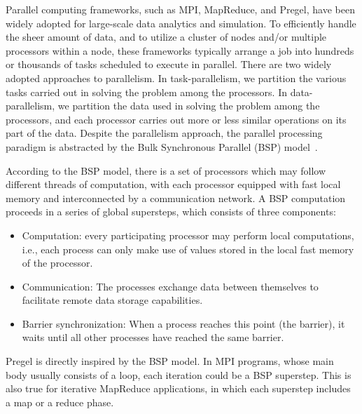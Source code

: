 Parallel computing frameworks, such as MPI, MapReduce, and Pregel, have been widely adopted for large-scale data analytics and simulation. To efficiently handle the sheer amount of data, and to utilize a cluster of nodes and/or multiple processors within a node, these frameworks typically arrange a job into hundreds or thousands of tasks scheduled to execute in parallel.
There are two widely adopted approaches to parallelism.
In task-parallelism, we partition the various tasks carried out in solving the problem among the processors. In data-parallelism, we partition the data used in solving the problem among the processors, and each processor carries out more or less similar operations on its part of the data. Despite the parallelism approach, the parallel processing paradigm is abstracted by the Bulk Synchronous Parallel (BSP) model~\cite{skillicorn1997questions}. 



According to the BSP model, there is a set of processors which may follow different threads of computation, with each processor equipped with fast local memory and interconnected by a communication network. A BSP computation proceeds in a series of global supersteps, which consists of three components:
\begin{itemize}
	\item Computation: every participating processor may perform local computations, i.e., each process can only make use of values stored in the local fast memory of the processor. 
    \item Communication: The processes exchange data between themselves to facilitate remote data storage capabilities.
	\item Barrier synchronization: When a process reaches this point (the barrier), it waits until all other processes have reached the same barrier.
\end{itemize}
Pregel is directly inspired by the BSP model. 
In MPI programs, whose main body usually consists of a loop, each iteration could be a BSP superstep. This is also true for iterative MapReduce applications, in which each superstep includes a map or a reduce phase. 



